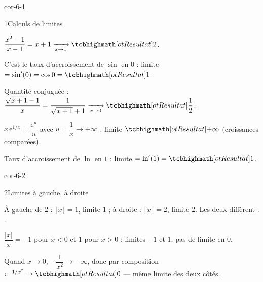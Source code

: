 
\corrigesSouples

\begin{blocLivre}{cor-6-1}
\begin{corrige}{1}{Calculs de limites}
\begin{questions}
  \item $\dfrac{x^{2}-1}{x-1}=x+1\xrightarrow[x\to1]{}\res{2}$.
  \item C'est le taux d'accroissement de $\sin$ en $0$ :
    limite $=\sin'(0)=\cos0=\res{1}$.
  \item Quantité conjuguée : $\dfrac{\sqrt{x+1}-1}{x}=\dfrac{1}{\sqrt{x+1}+1}
    \xrightarrow[x\to0]{}\res{\dfrac12}$.
  \item $x\,\mathrm{e}^{1/x}=\dfrac{\mathrm{e}^{u}}{u}$ avec $u=\dfrac1x\to+\infty$ :
    limite $\res{+\infty}$ (croissances comparées).
  \item Taux d'accroissement de $\ln$ en $1$ : limite $=\ln'(1)=\res{1}$.
\end{questions}
\end{corrige}
\end{blocLivre}

\begin{blocLivre}{cor-6-2}
\begin{corrige}{2}{Limites à gauche, à droite}
\begin{questions}
  \item À gauche de $2$ : $\lfloor x\rfloor=1$, limite $1$ ; à droite :
    $\lfloor x\rfloor=2$, limite $2$. Les deux diffèrent :
    .
  \item $\dfrac{|x|}{x}=-1$ pour $x<0$ et $1$ pour $x>0$ : limites $-1$ et
    $1$, pas de limite en $0$.
  \item Quand $x\to0$, $-\dfrac{1}{x^{2}}\to-\infty$, donc par composition
    $\mathrm{e}^{-1/x^{2}}\to\res{0}$ — même limite des deux côtés.
\end{questions}
\end{corrige}
\end{blocLivre}

